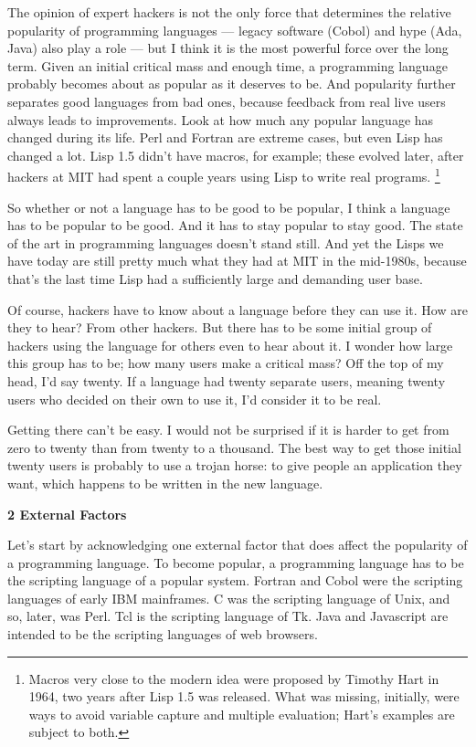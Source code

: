 \documentclass[12pt]{book}
\begin{document}
The opinion of expert hackers is not the only force that determines the
relative popularity of programming languages --- legacy software (Cobol)
and hype (Ada, Java) also play a role --- but I think it is the most
powerful force over the long term. Given an initial critical mass and
enough time, a programming language probably becomes about as popular as
it deserves to be. And popularity further separates good languages from
bad ones, because feedback from real live users always leads to
improvements. Look at how much any popular language has changed during
its life. Perl and Fortran are extreme cases, but even Lisp has changed
a lot. Lisp 1.5 didn't have macros, for example; these evolved later,
after hackers at MIT had spent a couple years using Lisp to write real
programs. \footnote{Macros very close to the modern idea were proposed by Timothy
Hart in 1964, two years after Lisp 1.5 was released. What was missing,
initially, were ways to avoid variable capture and multiple evaluation;
Hart's examples are subject to both.}

So whether or not a language has to be good to be popular, I think a
language has to be popular to be good. And it has to stay popular to
stay good. The state of the art in programming languages doesn't stand
still. And yet the Lisps we have today are still pretty much what they
had at MIT in the mid-1980s, because that's the last time Lisp had a
sufficiently large and demanding user base.

Of course, hackers have to know about a language before they can use it.
How are they to hear? From other hackers. But there has to be some
initial group of hackers using the language for others even to hear
about it. I wonder how large this group has to be; how many users make a
critical mass? Off the top of my head, I'd say twenty. If a language had
twenty separate users, meaning twenty users who decided on their own to
use it, I'd consider it to be real.

Getting there can't be easy. I would not be surprised if it is harder to
get from zero to twenty than from twenty to a thousand. The best way to
get those initial twenty users is probably to use a trojan horse: to
give people an application they want, which happens to be written in the
new language.

\textbf{2 External Factors}

Let's start by acknowledging one external factor that does affect the
popularity of a programming language. To become popular, a programming
language has to be the scripting language of a popular system. Fortran
and Cobol were the scripting languages of early IBM mainframes. C was
the scripting language of Unix, and so, later, was Perl. Tcl is the
scripting language of Tk. Java and Javascript are intended to be the
scripting languages of web browsers.
\end{document}
